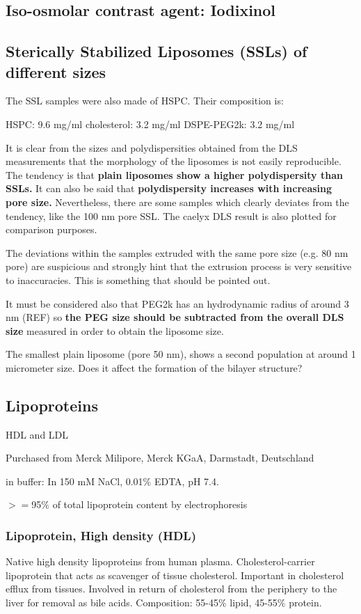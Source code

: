 \subsection{Iso-osmolar contrast agent: Iodixinol}
\subsection{Sterically Stabilized Liposomes (SSLs) of different sizes}

The SSL samples were also made of HSPC. Their composition is:

HSPC: 9.6 mg/ml
cholesterol: 3.2 mg/ml
DSPE-PEG2k: 3.2 mg/ml

It is clear from the sizes and polydispersities obtained from the DLS measurements that the morphology of the liposomes is not easily reproducible. The tendency is that \textbf{plain liposomes show a higher polydispersity than SSLs.} It can also be said that \textbf{polydispersity increases with increasing pore size.} Nevertheless, there are some samples which clearly deviates from the tendency, like the 100 nm pore SSL. The caelyx DLS result is also plotted for comparison purposes.

The deviations within the samples extruded with the same pore size (e.g. 80 nm pore) are suspicious and strongly hint that the extrusion process is very sensitive to inaccuracies. This is something that should be pointed out.

It must be considered also that PEG2k has an hydrodynamic radius of around 3 nm (REF) so \textbf{the PEG size should be subtracted from the overall DLS size} measured in order to obtain the liposome size.

The smallest plain liposome (pore 50 nm), shows a second population at around 1 micrometer size. Does it affect the formation of the bilayer structure?
\subsection{Lipoproteins}
HDL and LDL

Purchased from Merck Milipore, Merck KGaA, Darmstadt, Deutschland

in buffer: In 150 mM NaCl, 0.01$\%$ EDTA, pH 7.4. 

$>=$95$\%$ of total lipoprotein content by electrophoresis 

\subsubsection{Lipoprotein, High density (HDL)}
Native high density lipoproteins from human plasma. Cholesterol-carrier lipoprotein that acts as scavenger of tissue cholesterol. Important in cholesterol efflux from tissues. Involved in return of cholesterol from the periphery to the liver for removal as bile acids. Composition: 55-45$\%$ lipid, 45-55$\%$ protein.

